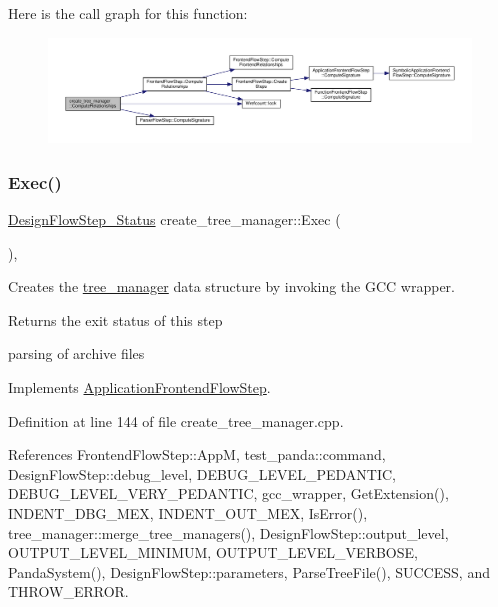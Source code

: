 Here is the call graph for this function\+:
\nopagebreak
\begin{figure}[H]
\begin{center}
\leavevmode
\includegraphics[width=350pt]{d6/d8a/classcreate__tree__manager_ac60f96c1a28f6faf3480e832f071ceb0_cgraph}
\end{center}
\end{figure}
\mbox{\label{classcreate__tree__manager_a1703cbe6a6f2df1ca3ef7809e8682fac}} 
\subsubsection{\texorpdfstring{Exec()}{Exec()}}
{\footnotesize\ttfamily \hyperlink{design__flow__step_8hpp_afb1f0d73069c26076b8d31dbc8ebecdf}{Design\+Flow\+Step\+\_\+\+Status} create\+\_\+tree\+\_\+manager\+::\+Exec (\begin{DoxyParamCaption}{ }\end{DoxyParamCaption})\hspace{0.3cm}{\ttfamily [override]}, {\ttfamily [virtual]}}



Creates the \hyperlink{classtree__manager}{tree\+\_\+manager} data structure by invoking the G\+CC wrapper. 

\begin{DoxyReturn}{Returns}
the exit status of this step 
\end{DoxyReturn}
parsing of archive files 

Implements \hyperlink{classApplicationFrontendFlowStep_a2bf060a5ebc1735635dc5c7773387a25}{Application\+Frontend\+Flow\+Step}.



Definition at line 144 of file create\+\_\+tree\+\_\+manager.\+cpp.



References Frontend\+Flow\+Step\+::\+AppM, test\+\_\+panda\+::command, Design\+Flow\+Step\+::debug\+\_\+level, D\+E\+B\+U\+G\+\_\+\+L\+E\+V\+E\+L\+\_\+\+P\+E\+D\+A\+N\+T\+IC, D\+E\+B\+U\+G\+\_\+\+L\+E\+V\+E\+L\+\_\+\+V\+E\+R\+Y\+\_\+\+P\+E\+D\+A\+N\+T\+IC, gcc\+\_\+wrapper, Get\+Extension(), I\+N\+D\+E\+N\+T\+\_\+\+D\+B\+G\+\_\+\+M\+EX, I\+N\+D\+E\+N\+T\+\_\+\+O\+U\+T\+\_\+\+M\+EX, Is\+Error(), tree\+\_\+manager\+::merge\+\_\+tree\+\_\+managers(), Design\+Flow\+Step\+::output\+\_\+level, O\+U\+T\+P\+U\+T\+\_\+\+L\+E\+V\+E\+L\+\_\+\+M\+I\+N\+I\+M\+UM, O\+U\+T\+P\+U\+T\+\_\+\+L\+E\+V\+E\+L\+\_\+\+V\+E\+R\+B\+O\+SE, Panda\+System(), Design\+Flow\+Step\+::parameters, Parse\+Tree\+File(), S\+U\+C\+C\+E\+SS, and T\+H\+R\+O\+W\+\_\+\+E\+R\+R\+OR.

